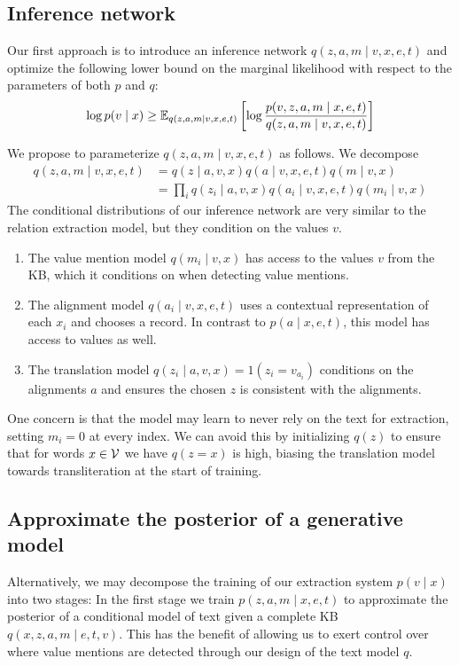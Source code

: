 \documentclass[12pt]{article}
\begin{document}
\subsection{Inference network}
Our first approach is to introduce an inference network $q(z,a,m\mid v,x,e,t)$
and optimize the following lower bound on the marginal likelihood
with respect to the parameters of both $p$ and $q$:
\begin{equation}
\label{eqn:lowerbound}
\log p(v\mid x) \geq
\mathbb{E}_{q(z,a,m\mid v,x,e,t)}\left[\log \frac{p(v,z,a,m\mid x,e,t)}{q(z,a,m\mid v,x,e,t)}\right]
\end{equation}

We propose to parameterize $q(z,a,m\mid v,x,e,t)$ as follows.
We decompose 
\begin{equation}
\begin{aligned}
q(z,a,m\mid v,x,e,t) &= q(z \mid a,v,x)q(a\mid v,x,e,t)q(m \mid v,x)\\
&= \prod_i q(z_i \mid a,v,x)q(a_i \mid v,x,e,t)q(m_i \mid v,x)
\end{aligned}
\end{equation}
The conditional distributions of our inference network
are very similar to the relation extraction model,
but they condition on the values $v$.
\begin{enumerate}
\item The value mention model $q(m_i \mid v,x)$ 
    has access to the values $v$ from the KB, which it conditions on
    when detecting value mentions. 
\item The alignment model $q(a_i \mid v,x,e,t)$
    uses a contextual representation of each $x_i$ and chooses a record.
    In contrast to $p(a\mid x,e,t)$, this model has access to values as well.
\item The translation model $q(z_i \mid a,v,x) = 1(z_i = v_{a_i})$
    conditions on the alignments $a$ and ensures the chosen $z$ is consistent
    with the alignments. 
\end{enumerate}

One concern is that the model may learn to never rely on the text for extraction,
setting $m_i = 0$ at every index.
We can avoid this by initializing $q(z)$ to ensure that for words $x \in \mathcal{V}$ 
we have $q(z = x)$ is high, biasing the translation model towards transliteration
at the start of training.

\subsection{Approximate the posterior of a generative model}
Alternatively, we may decompose the training of our extraction system $p(v\mid x)$ into two stages:
In the first stage we train $p(z,a,m\mid x,e,t)$ to approximate the posterior
of a conditional model of text given a complete KB $q(x,z,a,m \mid e,t,v)$.
This has the benefit of allowing us to exert control over where value mentions are detected
through our design of the text model $q$.
\end{document}
